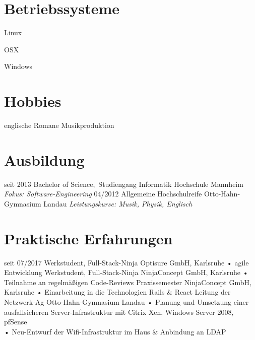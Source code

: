 \documentclass[
]{friggeri-cv}
\begin{document}
\begin{aside}
  \section{Betriebssysteme}
  \parbox[t]{1.5cm}{Linux} \color{orange}{\Smiley\Smiley\Smiley}
  \parbox[t]{1.5cm}{OSX} \color{orange}{\Smiley\Smiley}
  \parbox[t]{1.5cm}{Windows} \color{orange}{\Smiley}
  \section{Hobbies}
    englische Romane
    Musikproduktion
\end{aside}

\section{Ausbildung}

\begin{entrylist}
  \entry
    {seit 2013}
    {Bachelor of Science{\normalfont ,~Studiengang Informatik}}
    {Hochschule Mannheim}
    {\emph{Fokus: Software-Engineering}}
  \entry
    {04/2012}
    {Allgemeine Hochschulreife {\normalfont }}
    {Otto-Hahn-Gymnasium Landau}
    {\emph{Leistungskurse: Musik, Physik, Englisch}}
\end{entrylist}

\section{Praktische Erfahrungen}

\begin{entrylist}
  \entry
    {seit 07/2017}
    {Werkstudent, Full-Stack-Ninja}
    {Optisure GmbH, Karlsruhe}
    {%
      • agile Entwicklung
    }
  \entry
    {}
    {Werkstudent, Full-Stack-Ninja}
    {NinjaConcept GmbH, Karlsruhe}
    {%
      • Teilnahme an regelmäßigen Code-Reviews
    }
  \entry
    {}
    {Praxissemester}
    {NinjaConcept GmbH, Karlsruhe}
    {%
      • Einarbeitung in die Technologien Rails \& React
    }
  \entry
    {}
    {Leitung der Netzwerk-Ag}
    {Otto-Hahn-Gymnasium Landau}
    {%
      • Planung und Umsetzung einer ausfallsicheren Server-Infrastruktur mit Citrix Xen, Windows Server 2008, pfSense\\
      • Neu-Entwurf der Wifi-Infrastruktur im Haus \& Anbindung an LDAP
    }
\end{entrylist}
\end{document}
